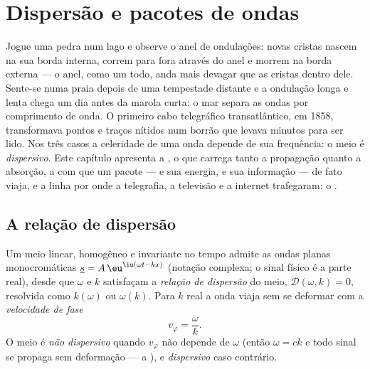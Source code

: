 \chapter{Dispersão e pacotes de ondas}\label{ch:b2:dispersion-wave-packets}

Jogue uma pedra num lago e observe o anel de ondulações: novas cristas
nascem na sua borda interna, correm para fora através do anel e morrem na
borda externa --- o anel, como um todo, anda mais devagar que as cristas dentro dele.
Sente-se numa praia depois de uma tempestade distante e a ondulação longa e lenta chega
um dia antes da marola curta: o mar separa as ondas por comprimento de onda. O
primeiro cabo telegráfico transatlântico, em 1858, transformava pontos e traços
nítidos num borrão que levava minutos para ser lido. Nos três casos a
celeridade de uma onda depende de sua frequência: o meio é
\emph{dispersivo}. Este capítulo apresenta a , o
 que carrega tanto a propagação quanto a absorção, a
 com que um pacote --- e sua energia, e sua
informação --- de fato viaja, e a linha por onde a telegrafia,
a televisão e a internet trafegaram: o .

\section{A relação de dispersão}

\begin{definition}\label{def:b2:dispersion-wave-packets:relation}
Um meio linear, homogêneo e invariante no tempo admite as ondas
planas monocromáticas $\underline s = A\,\eu^{\iu(\omega t - kx)}$ (notação
complexa; o sinal físico é a parte real), desde que $\omega$ e $k$
satisfaçam a \emph{relação de dispersão} do meio, $\mathcal D(\omega, k)
= 0$, resolvida como $k(\omega)$ ou $\omega(k)$. Para $k$ real a onda viaja
sem se deformar com a \emph{velocidade de fase}
\[
v_\varphi = \frac\omega k .
\]
O meio é \emph{não dispersivo} quando $v_\varphi$ não depende de
$\omega$ (então $\omega = ck$ e todo sinal se propaga sem deformação --- a
), e \emph{dispersivo} caso contrário.
\end{definition}

